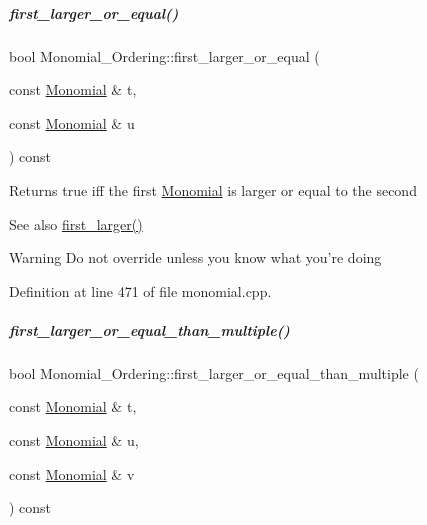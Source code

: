 \mbox{\label{group__orderinggroup_afbae8e00a02ce0334bb0376cf0f0db75}} 
\subparagraph{\texorpdfstring{first\+\_\+larger\+\_\+or\+\_\+equal()}{first\_larger\_or\_equal()}}
{\footnotesize\ttfamily bool Monomial\+\_\+\+Ordering\+::first\+\_\+larger\+\_\+or\+\_\+equal (\begin{DoxyParamCaption}\item[{const \hyperlink{group__polygroup_class_monomial}{Monomial} \&}]{t,  }\item[{const \hyperlink{group__polygroup_class_monomial}{Monomial} \&}]{u }\end{DoxyParamCaption}) const}

\begin{DoxyReturn}{Returns}
{\ttfamily true} iff the first \hyperlink{group__polygroup_class_monomial}{Monomial} is larger or equal to the second 
\end{DoxyReturn}
\begin{DoxySeeAlso}{See also}
\hyperlink{group__orderinggroup_aed41fe82e1ca5cd287a93d287fee7c20}{first\+\_\+larger()} 
\end{DoxySeeAlso}
\begin{DoxyWarning}{Warning}
Do not override unless you know what you're doing 
\end{DoxyWarning}


Definition at line 471 of file monomial.\+cpp.

\mbox{\label{group__orderinggroup_ad4af4c79cf46666222fe30fdd4ceb45e}} 
\subparagraph{\texorpdfstring{first\+\_\+larger\+\_\+or\+\_\+equal\+\_\+than\+\_\+multiple()}{first\_larger\_or\_equal\_than\_multiple()}}
{\footnotesize\ttfamily bool Monomial\+\_\+\+Ordering\+::first\+\_\+larger\+\_\+or\+\_\+equal\+\_\+than\+\_\+multiple (\begin{DoxyParamCaption}\item[{const \hyperlink{group__polygroup_class_monomial}{Monomial} \&}]{t,  }\item[{const \hyperlink{group__polygroup_class_monomial}{Monomial} \&}]{u,  }\item[{const \hyperlink{group__polygroup_class_monomial}{Monomial} \&}]{v }\end{DoxyParamCaption}) const}

